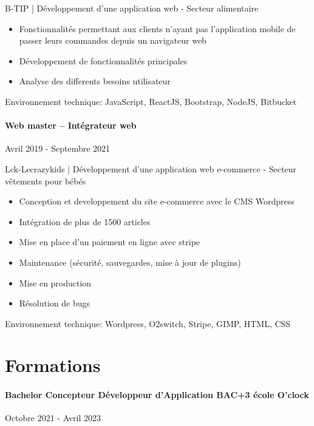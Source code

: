 \documentclass{article}
\begin{document}
\noindent
B-TIP | Développement d’une application web - Secteur alimentaire

\raggedright  
\begin{itemize}
  \item{Fonctionnalités permettant aux clients n’ayant pas l’application
mobile de passer leurs commandes depuis un navigateur web}
  \item{Développement de fonctionnalités principales}
  \item{Analyse des differents besoins utilisateur}
\end{itemize}
\noindent
Environnement technique: JavaScript, ReactJS, Bootstrap, NodeJS, Bitbucket
\paragraph{Web master – Intégrateur web}\hspace*{\fill}Avril 2019 - Septembre 2021

\noindent
Lck-Lecrazykids | Développement d’une application web e-commerce - Secteur vêtements pour bébés

\raggedright  
\begin{itemize}
  \item{Conception et developpement du site e-commerce avec le CMS Wordpress}
  \item{Intégration de plus de 1500 articles}
  \item{Mise en place d’un paiement en ligne avec stripe}
  \item{Maintenance (sécurité, sauvegardes, mise à jour de plugins)}
  \item{Mise en production}
  \item{Résolution de bugs}
\end{itemize}
\noindent
Environnement technique: Wordpress, O2switch, Stripe, GIMP, HTML, CSS

\vspace{2ex}
\hrulefill
\section*{Formations}
\paragraph{Bachelor Concepteur Développeur d’Application BAC+3 école O'clock}\hspace*{\fill}Octobre 2021 - Avril 2023
\end{document}
